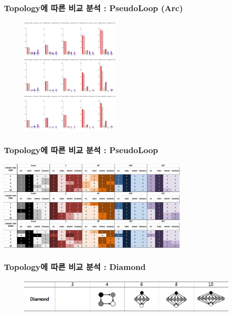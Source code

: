 \documentclass{beamer}
\begin{document}
\begin{frame}
\frametitle{Topology에 따른 비교 분석 : PseudoLoop (Arc)}
{\scriptsize{}
	\begin{figure}
		\includegraphics[height=170pt]{images/04_PseudoLoop_Arcs}
	\end{figure}	
}
\end{frame}


\begin{frame}
\frametitle{Topology에 따른 비교 분석 : PseudoLoop}
{\scriptsize{}
	\begin{center}
		\includegraphics[height=130pt]{images/Result_PseudoLoop}
	\end{center}
}
\end{frame}




\begin{frame}
\frametitle{Topology에 따른 비교 분석 : Diamond}
{\scriptsize{}
	\begin{figure}
		\includegraphics[height=50pt]{images/Topologies_Diamond}
	\end{figure}	
}
\end{frame}
\end{document}

